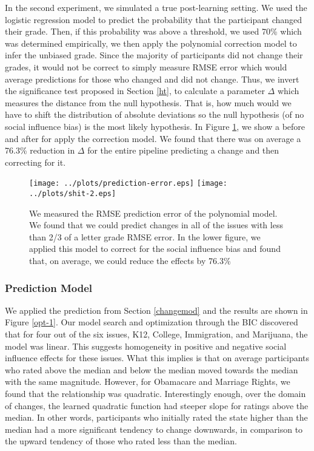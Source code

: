 In the second experiment, we simulated a true post-learning setting.
We used the logistic regression model to predict the probability that the participant changed their grade.
Then, if this probability was above a threshold, we used 70\% which was determined empirically, we then apply the polynomial correction model
to infer the unbiased grade.
Since the majority of participants did not change their grades, it would not be correct to simply measure RMSE error which would average predictions for those who changed and did not change.
Thus, we invert the significance test proposed in Section \ref{ht}, to calculate a parameter $\Delta$ which measures the distance from the null hypothesis.
That is, how much would we have to shift the distribution of absolute deviations so the null hypothesis (of no social influence bias) is the most likely hypothesis.
In Figure \ref{poly-1}, we show a before and after for apply the correction model.
We found that there was on average a 76.3\% reduction in $\Delta$ for the entire pipeline predicting a change and then correcting for it. 

\begin{figure}[h]
\hspace*{-2em}
    \texttt{[image: ../plots/prediction-error.eps]}
    \hspace*{-2em}
    \texttt{[image: ../plots/shit-2.eps]}
      \caption{We measured the RMSE prediction error of the polynomial model. We found that we could predict changes in all of the issues with less than 2/3 of a letter grade RMSE error. In the lower figure, we applied this model to correct for the social influence bias and found that, on average, we could reduce the effects by 76.3\%}
      \label{poly-1}
\end{figure}

\subsubsection{Prediction Model}
We applied the prediction from Section \ref{changemod} and the results are shown in Figure \ref{opt-1}.
Our model search and optimization through the BIC discovered that for four out of the six issues, K12, College, Immigration, and Marijuana, the model was linear.
This suggests homogeneity in positive and negative social influence effects for these issues.
What this implies is that on average participants who rated above the median and below the median moved towards the median with the same magnitude.
However, for Obamacare and Marriage Rights, we found that the relationship was quadratic.
Interestingly enough, over the domain of changes, the learned quadratic function had steeper slope for ratings above the median.
In other words, participants who initially rated the state higher than the median had a more significant tendency to change downwards, in comparison to the upward tendency of those who rated less than the median.

